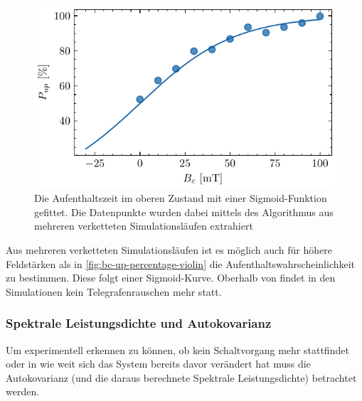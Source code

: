 \documentclass[main.tex]{subfiles}
\begin{document}
\begin{figure}[H]
    \centering
    \includegraphics{bilder/plots/max_Bz/up_percentage_fit.pdf}
    \caption[Die Aufenthaltszeit im oberen Zustand mit einer Sigmoid-Funktion gefittet.]{Die Aufenthaltszeit im oberen Zustand mit einer Sigmoid-Funktion gefittet. Die Datenpunkte wurden dabei mittels des Algorithmus aus mehreren verketteten Simulationsläufen extrahiert}\label{fig:bc-up-percentage}
\end{figure}

Aus mehreren verketteten Simulationsläufen ist es möglich auch für höhere Feldstärken als in \cref{fig:bc-up-percentage-violin} die Aufenthaltswahrscheinlichkeit zu bestimmen. Diese folgt einer Sigmoid-Kurve. Oberhalb von  findet in den Simulationen kein Telegrafenrauschen mehr statt.

\newpage
\subsubsection{Spektrale Leistungsdichte und Autokovarianz}

Um experimentell erkennen zu können, ob kein Schaltvorgang mehr stattfindet oder in wie weit sich das System bereits davor verändert hat muss die Autokovarianz (und die daraus berechnete Spektrale Leistungsdichte) betrachtet werden.

\end{document}
